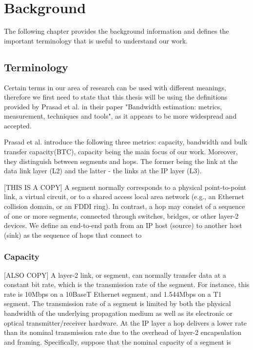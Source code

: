 \chapter{Background}
The following chapter provides the background information and defines the important terminology that is useful to understand our work.

\section{Terminology}
Certain terms in our area of research can be used with different meanings, therefore we first need to state that this thesis will be using the definitions provided by Prasad et al. \cite{prasad} in their paper "Bandwidth estimation: metrics, measurement, techniques and tools", as it appears to be more widespread and accepted.

Prasad et al. \cite{prasad} introduce the following three metrics: capacity, bandwidth and bulk transfer capacity(BTC), capacity being the main focus of our work.
Moreover, they distinguish between segments and hops. The former being the link at the data link layer (L2) and the latter - the links at the IP layer (L3).

[THIS IS A COPY]
A segment normally corresponds to a physical point-to-point link, a virtual circuit, or to a shared access local area network (e.g., an Ethernet collision
domain, or an FDDI ring). In contrast, a hop may consist of a sequence of one or more segments, connected through switches, bridges, or other layer-2 devices. We
define an end-to-end path from an IP host (source) to another host (sink) as the sequence of hops that connect to 

\subsection*{Capacity}
[ALSO COPY]
A layer-2 link, or segment, can normally transfer data at a constant bit rate, which is the transmission rate of the segment. For instance, this rate is 10Mbps
on a 10BaseT Ethernet segment, and 1.544Mbps on a T1 segment. The transmission rate of a segment is limited by both the physical bandwidth of the underlying
propagation medium as well as its electronic or optical transmitter/receiver hardware. 
At the IP layer a hop delivers a lower rate than its nominal transmission rate due to the overhead of layer-2 encapsulation and framing. Specifically, suppose that the nominal capacity of a segment is

